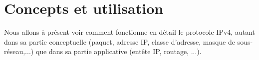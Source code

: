 
\section{Concepts et utilisation}

Nous allons à présent voir comment fonctionne en détail le protocole IPv4,
autant dans sa partie conceptuelle (paquet, adresse IP, classe d'adresse,
masque de sous-réseau,...) que dans sa partie applicative (entête IP, routage,
...).




